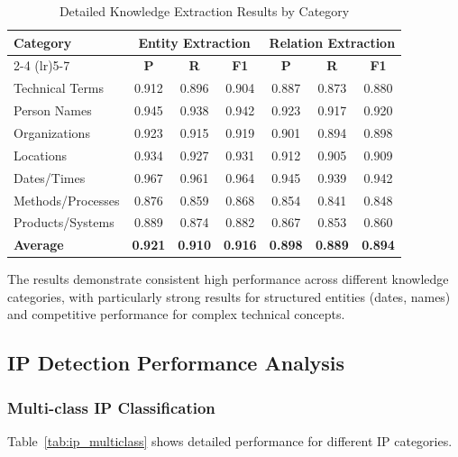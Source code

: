 \documentclass[11pt,a4paper]{article}
\begin{document}
\begin{table}[htbp]
\centering
\caption{Detailed Knowledge Extraction Results by Category}
\label{tab:ke_detailed}
\begin{tabular}{lcccccc}
\toprule
\multirow{2}{*}{\textbf{Category}} & \multicolumn{3}{c}{\textbf{Entity Extraction}} & \multicolumn{3}{c}{\textbf{Relation Extraction}} \\
\cmidrule(lr){2-4} \cmidrule(lr){5-7}
& \textbf{P} & \textbf{R} & \textbf{F1} & \textbf{P} & \textbf{R} & \textbf{F1} \\
\midrule
Technical Terms & 0.912 & 0.896 & 0.904 & 0.887 & 0.873 & 0.880 \\
Person Names & 0.945 & 0.938 & 0.942 & 0.923 & 0.917 & 0.920 \\
Organizations & 0.923 & 0.915 & 0.919 & 0.901 & 0.894 & 0.898 \\
Locations & 0.934 & 0.927 & 0.931 & 0.912 & 0.905 & 0.909 \\
Dates/Times & 0.967 & 0.961 & 0.964 & 0.945 & 0.939 & 0.942 \\
Methods/Processes & 0.876 & 0.859 & 0.868 & 0.854 & 0.841 & 0.848 \\
Products/Systems & 0.889 & 0.874 & 0.882 & 0.867 & 0.853 & 0.860 \\
\midrule
\textbf{Average} & \textbf{0.921} & \textbf{0.910} & \textbf{0.916} & \textbf{0.898} & \textbf{0.889} & \textbf{0.894} \\
\bottomrule
\end{tabular}
\end{table}

The results demonstrate consistent high performance across different knowledge categories, with particularly strong results for structured entities (dates, names) and competitive performance for complex technical concepts.

\subsection{IP Detection Performance Analysis}

\subsubsection{Multi-class IP Classification}

Table~\ref{tab:ip_multiclass} shows detailed performance for different IP categories.
\end{document}

